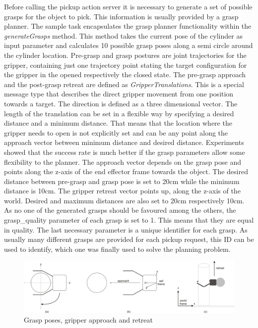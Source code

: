 Before calling the pickup action server it is necessary to generate a set of possible grasps for the object to pick. This information is usually provided by a grasp planner. The sample task encapsulates the grasp planner functionality within the \emph{generateGrasps} method. This method takes the current pose of the cylinder as input parameter and calculates 10 possible grasp poses along a semi circle around the cylinder location. Pre-grasp and grasp postures are joint trajectories for the gripper, containing just one trajectory point stating the target configuration for the gripper in the opened respectively the closed state. The pre-grasp approach and the post-grasp retreat are defined as \emph{GripperTranslations}. This is a special message type that describes the direct gripper movement from one position towards a target. The direction is defined as a three dimensional vector. The length of the translation can be set in a flexible way by specifying a desired distance and a minimum distance. That means that the location where the gripper needs to open is not explicitly set and can be any point along the approach vector between minimum distance and desired distance. Experiments showed that the success rate is much better if the grasp parameters allow some flexibility to the planner. The approach vector depends on the grasp pose and points along the z-axis of the end effector frame towards the object. The desired distance between pre-grasp and grasp pose is set to 20cm while the minimum distance is 10cm. The gripper retreat vector points up, along the z-axis of the world. Desired and maximum distances are also set to 20cm respectively 10cm. As no one of the generated grasps should be favoured among the others, the grasp\_quality parameter of each grasp is set to 1. This means that they are equal in quality. The last necessary parameter is a unique identifier for each grasp. As usually many different grasps are provided for each pickup request, this ID can be used to identify, which one was finally used to solve the planning problem.

\begin{figure}[ht]
	\centering
  	\includegraphics[width=1.0\textwidth]{images/grasp_a-c.jpg}
	\caption{Grasp poses, gripper approach and retreat}
	\label{fig:grasp_stages}
\end{figure}

